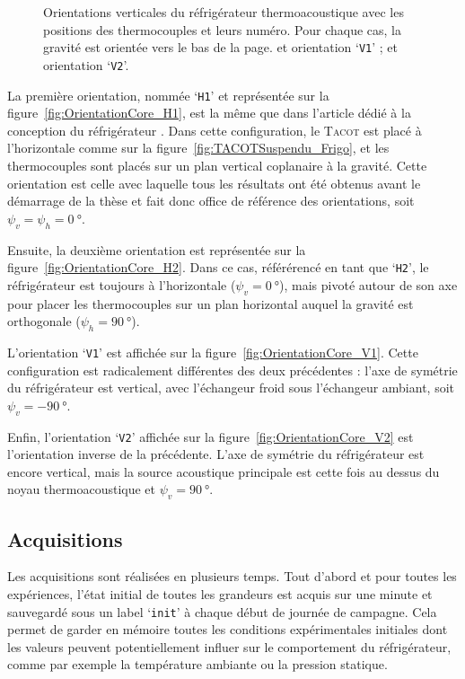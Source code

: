 \begin{figure}[!htp]
\begin{subfigure}[c]{.4\textwidth}
		\caption{}
		\label{fig:OrientationCore_V2_Schema}
	\end{subfigure} 	
 	\caption{Orientations verticales du réfrigérateur thermoacoustique avec les positions des thermocouples et leurs numéro. Pour chaque cas, la gravité est orientée vers le bas de la page.  et  orientation `\texttt{V1}' ;  et  orientation  `\texttt{V2}'.}%
    \label{fig:OrientationCore_V} %
\end{figure}



La première orientation, nommée `\texttt{H1}' et représentée sur la figure~\ref{fig:OrientationCore_H1}, est la même que dans l'article dédié à la conception du réfrigérateur \cite{ramadan_design_2021}. Dans cette configuration, le \textsc{Tacot} est placé à l'horizontale comme sur la figure~\ref{fig:TACOTSuspendu_Frigo}, et les thermocouples sont placés sur un plan vertical coplanaire à la gravité. Cette orientation est celle avec laquelle tous les résultats ont été obtenus avant le démarrage de la thèse et fait donc office de référence des orientations, soit $\psi_v=\psi_h=\qty{0}{\degree}$.\smallskip

Ensuite, la deuxième orientation est représentée sur la figure~\ref{fig:OrientationCore_H2}. Dans ce cas, référérencé en tant que `\texttt{H2}', le réfrigérateur est toujours à l'horizontale ($\psi_v=\qty{0}{\degree}$), mais pivoté autour de son axe pour placer les thermocouples sur un plan horizontal auquel la gravité est orthogonale ($\psi_h=\qty{90}{\degree}$).\smallskip

L'orientation `\texttt{V1}' est affichée sur la figure~\ref{fig:OrientationCore_V1}. Cette configuration est radicalement différentes des deux précédentes : l'axe de symétrie du réfrigérateur est vertical, avec l'échangeur froid sous l'échangeur ambiant, soit $\psi_v=\qty{-90}{\degree}$. \smallskip

Enfin, l'orientation `\texttt{V2}' affichée sur la figure~\ref{fig:OrientationCore_V2} est l'orientation inverse de la précédente. L'axe de symétrie du réfrigérateur est encore vertical, mais la source acoustique principale est cette fois au dessus du noyau thermoacoustique et $\psi_v=\qty{+90}{\degree}$.

\subsection{Acquisitions}
Les acquisitions sont réalisées en plusieurs temps. Tout d'abord et pour toutes les expériences,  l'état initial de toutes les grandeurs est acquis sur une minute et sauvegardé sous un label `\texttt{init}' à chaque début de journée de campagne. Cela permet de garder en mémoire toutes les conditions expérimentales initiales dont les valeurs peuvent potentiellement influer sur le comportement du réfrigérateur, comme par exemple la température ambiante ou la pression statique. \medskip


